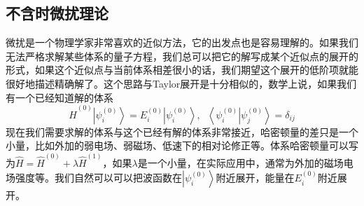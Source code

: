 \documentclass[12pt,a4paper,openany,twoside]{book}
\numberwithin{equation}{section}
\begin{document}
        \subsection{不含时微扰理论}
          微扰是一个物理学家非常喜欢的近似方法，它的出发点也是容易理解的。如果我们无法严格求解某些体系的量子方程，我们总可以把它的解写成某个近似点的展开的形式，如果这个近似点与当前体系相差很小的话，我们期望这个展开的低阶项就能很好地描述精确解了。这个思路与Taylor展开是十分相似的，数学上说，如果我们有一个已经知道解的体系
          \begin{equation}
            \hat{H}^{(0)}\left|\psi_i^{(0)}\right\rangle=E_i^{(0)} \left|\psi_i^{(0)}\right\rangle,\;\;\left\langle\psi_i^{(0)}\right.\left|\psi_j^{(0)}\right\rangle = \delta_{ij}
          \end{equation}
          现在我们需要求解的体系与这个已经有解的体系非常接近，哈密顿量的差只是一个小量，比如外加的弱电场、弱磁场、低速下的相对论修正等。体系哈密顿量可以写为$\hat{H}= \hat{H}^{(0)}+\lambda\hat{H}^{(1)}$，如果$\lambda$是一个小量，在实际应用中，通常为外加的磁场电场强度等。我们自然可以可以把波函数在$\left|\psi_i^{(0)}\right\rangle$附近展开，能量在$E_i^{(0)}$附近展开。
\end{document}
